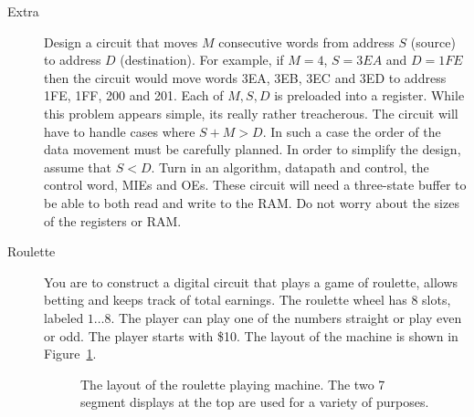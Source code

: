 \begin{description}
        \pagebreak

    \item [Extra]
        Design a circuit that moves $M$ consecutive words from address $S$ (source) to
        address $D$ (destination).  For example, if $M=4$, $S=3EA$ and $D=1FE$ then the
        circuit would move words 3EA, 3EB, 3EC and 3ED to address 1FE, 1FF, 200 and 201.
        Each of $M,S,D$ is preloaded into a register.  While this problem appears simple,
        its really rather treacherous.  The circuit will have to handle cases where
        $S+M > D$.  In such a case the order of the data movement must be carefully planned.
        In order to simplify the design, assume that $S<D$.  Turn in an algorithm,
        datapath and control, the
        control word, MIEs and OEs.  These circuit will need a three-state buffer to
        be able to both read and write to the RAM.  Do not worry about the sizes of the
        registers or RAM.

    \item[Roulette]

        You are to construct a digital circuit that plays a game of
        roulette, allows betting and keeps track of total earnings.
        The roulette wheel has 8 slots, labeled $1 \ldots 8$.  The player
        can play one of the numbers straight or play even or odd.
        The player starts with \$10.
        The layout of the machine is shown in Figure~\ref{fig:Roulette}.
        \begin{figure}[ht]
            \caption{The layout of the roulette playing machine.
                The two 7 segment displays at the top are used for a variety
            of purposes.}
            \label{fig:Roulette}
        \end{figure}


\end{description}
